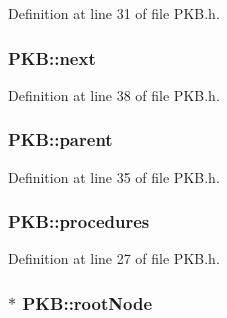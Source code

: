 Definition at line 31 of file P\-K\-B.\-h.

\hypertarget{class_p_k_b_a72e85289ddb59ff230cc7aace31826b5}{
\subsubsection[{next}]{ P\-K\-B\-::next\hspace{0.3cm}{\ttfamily [static]}}}\label{class_p_k_b_a72e85289ddb59ff230cc7aace31826b5}


Definition at line 38 of file P\-K\-B.\-h.

\hypertarget{class_p_k_b_a92894a22bbf3b6e449f30c6bee9f070a}{
\subsubsection[{parent}]{ P\-K\-B\-::parent\hspace{0.3cm}{\ttfamily [static]}}}\label{class_p_k_b_a92894a22bbf3b6e449f30c6bee9f070a}


Definition at line 35 of file P\-K\-B.\-h.

\hypertarget{class_p_k_b_ae426b49eef5572e594a3a465e6e462b3}{
\subsubsection[{procedures}]{ P\-K\-B\-::procedures\hspace{0.3cm}{\ttfamily [static]}}}\label{class_p_k_b_ae426b49eef5572e594a3a465e6e462b3}


Definition at line 27 of file P\-K\-B.\-h.

\hypertarget{class_p_k_b_a5978f3d40a8d0bb732ba708440d499b8}{
\subsubsection[{root\-Node}]{ $\ast$ P\-K\-B\-::root\-Node\hspace{0.3cm}{\ttfamily [static]}}}\label{class_p_k_b_a5978f3d40a8d0bb732ba708440d499b8}


